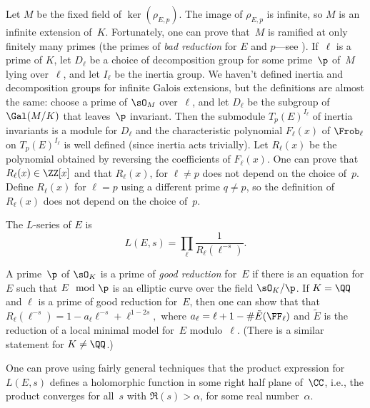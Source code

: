 Let $M$ be the fixed field of $\ker(\rho_{E,p})$. The image of
$\rho_{E,p}$ is infinite, so $M$ is an infinite extension of~$K$.
Fortunately, one can prove that~$M$ is ramified at only finitely many
primes (the primes of \emph{bad reduction} for $E$ and $p$---see
\cite{serre-tate}). If~$\ell$ is a prime of $K$, let $D_{\ell}$ be a choice of
decomposition group for some prime~$\p$ of~$M$ lying over~$\ell$,
and let $I_{\ell}$ be the inertia group.
We haven't defined inertia and decomposition groups
for infinite Galois extensions, but the definitions are almost the
same: choose a prime of $\sO_M$ over~$\ell$, and let $D_{\ell}$ be the
subgroup of $\Gal(M/K)$ that leaves~$\p$ invariant.  Then the
submodule $T_p(E)^{I_{\ell}}$ of inertia invariants is a module for
$D_{\ell}$ and the characteristic polynomial $F_{\ell}(x)$ of
$\Frob_{\ell}$ on $T_p(E)^{I_{\ell}}$ is well defined (since inertia
acts trivially).  Let $R_{\ell}(x)$ be the polynomial obtained by
reversing the coefficients of $F_{\ell}(x)$.  One can prove that
$R_{\ell}(x) \in \ZZ[x]$ and that $R_{\ell}(x)$, for $\ell\neq p$ does
not depend on the choice of~$p$.  Define $R_{\ell}(x)$ for $\ell=p$
using a different prime $q\neq p$, so the definition of $R_{\ell}(x)$
does not depend on the choice of~$p$.
\begin{definition}
  The $L$-series of $E$ is
  \[
  L(E,s) = \prod_{\ell} \frac{1}{R_\ell(\ell^{-s})}.
  \]
\end{definition}

A prime~$\p$ of $\sO_K$ is a prime of \emph{good reduction} for~$E$ if
there is an equation for $E$ such that $E \mod \p$ is an elliptic
curve over the field $\sO_K/\p$. If $K=\QQ$ and $\ell$ is a prime of
good reduction for~$E$, then one can show that that
$R_{\ell}(\ell^{-s}) = 1 - a_\ell \ell^{-s} + \ell^{1-2s},$
where $a_{\ell} = \ell + 1 - \#\tilde{E}(\FF_\ell)$
and $\tilde{E}$ is the reduction of a local minimal
model for~$E$ modulo~$\ell$.  (There is a similar statement
for $K\neq \QQ$.)

One can prove using fairly general techniques that the product
expression for $L(E,s)$ defines a holomorphic function in some right
half plane of~$\CC$, i.e., the product converges for all~$s$ with
$\Re(s)>\alpha$, for some real number~$\alpha$.

